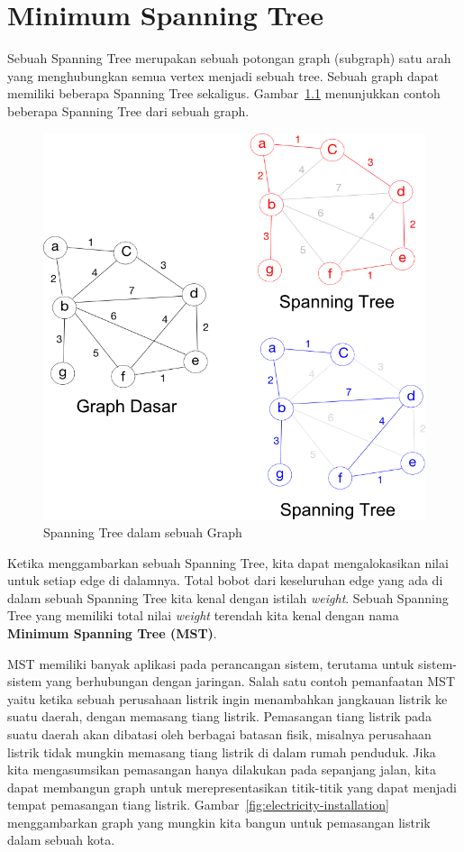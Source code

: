 \chapter{Minimum Spanning Tree}

Sebuah Spanning Tree merupakan sebuah potongan graph (subgraph) satu arah yang menghubungkan semua vertex menjadi sebuah tree. Sebuah graph dapat memiliki beberapa Spanning Tree sekaligus. Gambar~\ref{fig:spanning-tree-intro} menunjukkan contoh beberapa Spanning Tree dari sebuah graph.

\begin{figure}
    \includegraphics[width=\textwidth,keepaspectratio]{fig/SpanningTreeIntro.png}%
	\caption{Spanning Tree dalam sebuah Graph}%
	\label{fig:spanning-tree-intro}%
\end{figure}

Ketika menggambarkan sebuah Spanning Tree, kita dapat mengalokasikan nilai untuk setiap edge di dalamnya. Total bobot dari keseluruhan edge yang ada di dalam sebuah Spanning Tree kita kenal dengan istilah \textit{weight}. Sebuah Spanning Tree yang memiliki total nilai \textit{weight} terendah kita kenal dengan nama \textbf{Minimum Spanning Tree (MST)}.

MST memiliki banyak aplikasi pada perancangan sistem, terutama untuk sistem-sistem yang berhubungan dengan jaringan. Salah satu contoh pemanfaatan MST yaitu ketika sebuah perusahaan listrik ingin menambahkan jangkauan listrik ke suatu daerah, dengan memasang tiang listrik. Pemasangan tiang listrik pada suatu daerah akan dibatasi oleh berbagai batasan fisik, misalnya perusahaan listrik tidak mungkin memasang tiang listrik di dalam rumah penduduk. Jika kita mengasumsikan pemasangan hanya dilakukan pada sepanjang jalan, kita dapat membangun graph untuk merepresentasikan titik-titik yang dapat menjadi tempat pemasangan tiang listrik. Gambar~\ref{fig:electricity-installation} menggambarkan graph yang mungkin kita bangun untuk pemasangan listrik dalam sebuah kota.

